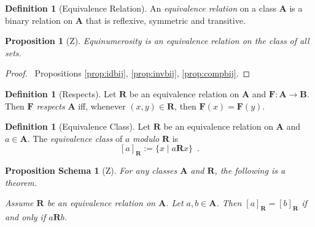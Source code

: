 \documentclass{book}
\let\qed\relax
\newtheorem{prop}[ax]{Proposition}
\newtheorem{props}[ax]{Proposition Schema}
\theoremstyle{definition}
\newtheorem{df}[ax]{Definition}
\begin{document}
\begin{df}[Equivalence Relation]
An \emph{equivalence relation} on a class $\mathbf{A}$ is a binary relation on $\mathbf{A}$ that is reflexive, symmetric and transitive.
\end{df}

\begin{prop}[Z]
Equinumerosity is an equivalence relation on the class of all sets.
\end{prop}

\begin{proof}
\pf\ Propositions \ref{prop:idbij}, \ref{prop:invbij}, \ref{prop:compbij}. \qed
\end{proof}

\begin{df}[Respects]
Let $\mathbf{R}$ be an equivalence relation on $\mathbf{A}$ and $\mathbf{F} : \mathbf{A} \rightarrow \mathbf{B}$. Then $\mathbf{F}$ \emph{respects} $\mathbf{A}$ iff, whenever $(x,y) \in \mathbf{R}$, then $\mathbf{F}(x) = \mathbf{F}(y)$.
\end{df}

\begin{df}[Equivalence Class]
Let $\mathbf{R}$ be an equivalence relation on $\mathbf{A}$ and $a \in \mathbf{A}$. The \emph{equivalence class} of $a$ \emph{modulo} $\mathbf{R}$ is
\[ [a]_{\mathbf{R}} := \{ x \mid a \mathbf{R} x \} \enspace . \]
\end{df}

\begin{props}[Z]
\label{prop:eqclassequal}
For any classes $\mathbf{A}$ and $\mathbf{R}$, the following is a theorem.

Assume $\mathbf{R}$ be an equivalence relation on $\mathbf{A}$. Let $a,b \in \mathbf{A}$. Then $[a]_\mathbf{R} = [b]_\mathbf{R}$ if and only if $a \mathbf{R} b$.
\end{props}
\end{document}

